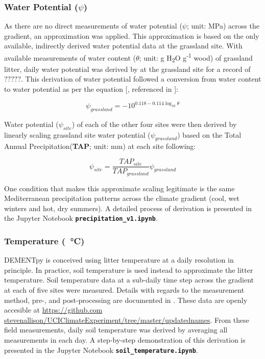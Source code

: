 \documentclass[letterpaper, 10pt]{article}
\begin{document}
\subsubsection{Water Potential ($\psi$)}
As there are no direct measurements of water potential ($\psi$; unit: MPa) across the gradient, an approximation was applied. This approximation is based on the only available, indirectly derived water potential data at the grassland site. With available measurements of water content ($\theta$; unit: g H\textsubscript{2}O g\textsuperscript{-1} wood) of grassland litter, daily water potential was derived by \citet{allison2017consequences} at the grassland site for a record of $?????$. This derivation of water potential followed a conversion from water content to water potential as per the equation [\citet{dix1985changes}, referenced in \citet{allison2017consequences}]:

\begin{equation}
  \psi_{grassland} = -10^{0.118-0.114\log_{10} \theta}
\end{equation}

Water potential ($\psi_{site}$) of each of the other four sites were then derived by linearly scaling grassland site water potential ($\psi_{grassland}$) based on the Total Annual Precipitation(\textbf{TAP}; unit: mm) at each site following:

\begin{equation}
  \psi_{site} = \frac{TAP_{site}}{TAP_{grassland}} \psi_{grassland}
\end{equation}

One condition that makes this approximate scaling legitimate is the same Mediterranean precipitation patterns across the climate gradient (cool, wet winters and hot, dry summers). A detailed process of derivation is presented in the Jupyter Notebook \textbf{\texttt{precipitation\_v1.ipynb}}.


\subsubsection{Temperature (\SI{}{\celsius})}
DEMENTpy is conceived using litter temperature at a daily resolution in principle. In practice, soil temperature is
used instead to approximate the litter temperature. Soil temperature data at a sub-daily time step across the gradient
at each of five sites were measured. Details with regards to the measurement method, pre-, and post-processing are
documented in \citet{glassman2018decomposition}. These data are openly accesible at \url{https://github.com
stevenallison/UCIClimateExperiment/tree/master/updatednames}. From these field measurements, daily soil
temperature was derived by averaging all measurements in each day. A step-by-step demonstration of this derivation
is presented in the Jupyter Notebook \textbf{\texttt{soil\_temperature.ipynb}}.
\end{document}
